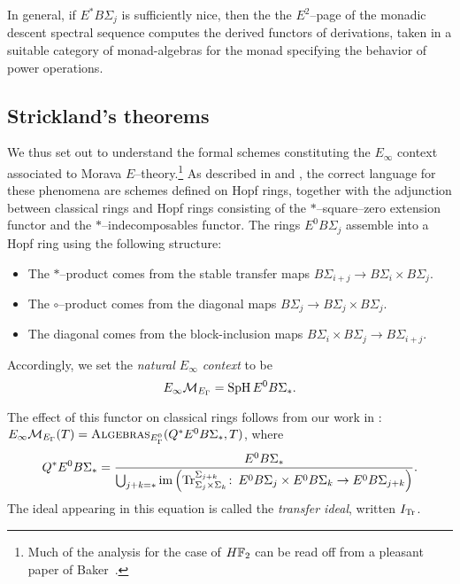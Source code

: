 \begin{remark}
In general, if \(E^* B\Sigma_j\) is sufficiently nice, then the the \(E^2\)--page of the monadic descent spectral sequence computes the derived functors of derivations, taken in a suitable category of monad-algebras for the monad specifying the behavior of power operations.
\end{remark}






\subsection*{Strickland's theorems}

We thus set out to understand the formal schemes constituting the \(E_\infty\) context associated to Morava \(E\)--theory.\footnote{Much of the analysis for the case of \(\HFtwo\) can be read off from a pleasant paper of Baker~\cite{Baker}.}  As described in  and , the correct language for these phenomena are schemes defined on Hopf rings, together with the adjunction between classical rings and Hopf rings consisting of the \(\ast\)--square--zero extension functor and the \(\ast\)--indecomposables functor.  The rings \(E^0 B\Sigma_j\) assemble into a Hopf ring using the following structure:
\begin{itemize}
    \item The \(\ast\)--product comes from the stable transfer maps \(B\Sigma_{i+j} \to B\Sigma_i \times B\Sigma_j\).
    \item The \(\circ\)--product comes from the diagonal maps \(B\Sigma_j \to B\Sigma_j \times B\Sigma_j\).
    \item The diagonal comes from the block-inclusion maps \(B\Sigma_i \times B\Sigma_j \to B\Sigma_{i+j}\).
\end{itemize}

\begin{definition}
Accordingly, we set the \textit{natural \(E_\infty\) context} to be \[E_\infty\mathcal{M}_{E_\Gamma} = \operatorname{SpH} E^0 B\Sigma_*.\]
\end{definition}

The effect of this functor on classical rings follows from our work in : \(E_\infty\mathcal{M}_{E_\Gamma}(T) = \normalfont\textsc{Algebras}_{E_\Gamma^0}(Q^* E^0 B\Sigma_*, T)\), where \[Q^* E^0 B\Sigma_* = \frac{E^0 B\Sigma_*}{\bigcup_{j+k=*}\operatorname{im}\left(\mathrm{Tr}_{\Sigma_j \times \Sigma_k}^{\Sigma_{j + k}}\colon\thinspace E^0 B\Sigma_j \times E^0 B\Sigma_k \to E^0 B\Sigma_{j+k}\right)}.\]  The ideal appearing in this equation is called the \textit{transfer ideal}, written \(I_{\mathrm{Tr}}\).


